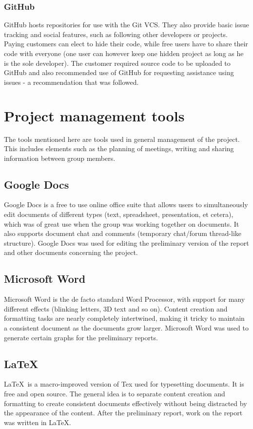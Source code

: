 \subsubsection{GitHub}
\label{GitHub}
GitHub hosts repositories for use with the Git VCS. They also provide basic issue tracking and social features, such as following other developers or projects. Paying customers can elect to hide their code, while free users have to share their code with everyone (one user can however keep one hidden project as long as he is the sole developer). The customer required source code to be uploaded to GitHub and also recommended use of GitHub for requesting assistance using issues - a recommendation that was followed.

\section{Project management tools}
The tools mentioned here are tools used in general management of the project. This includes elements such as the planning of meetings, writing and sharing information between group members.

\subsection{Google Docs}
Google Docs is a free to use online office suite that allows users to simultaneously edit documents of different types (text, spreadsheet, presentation, et cetera), which was of great use when the group was working together on documents. It also supports document chat and comments (temporary chat/forum thread-like structure). Google Docs was used for editing the preliminary version of the report and other documents concerning the project.

\subsection{Microsoft Word}
Microsoft Word is the de facto standard Word Processor, with support for many different effects (blinking letters, 3D text and so on). Content creation and formatting tasks are nearly completely intertwined, making it tricky to maintain a consistent document as the documents grow larger. Microsoft Word was used to generate certain graphs for the preliminary reports.

\subsection{\LaTeX}
\LaTeX ~is a macro-improved version of Tex used for typesetting documents. It is free and open source. The general idea is to separate content creation and formatting to create consistent documents effectively without being distracted by the appearance of the content. After the preliminary report, work on the report was written in \LaTeX.

